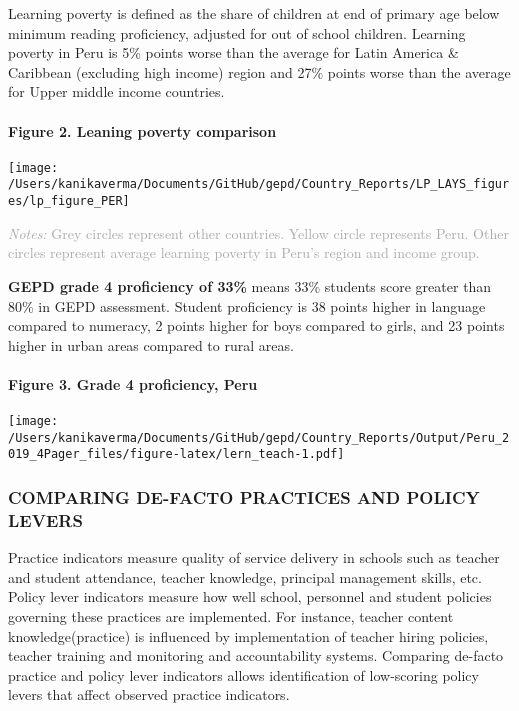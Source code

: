 \documentclass[twocolumn]{article}
\let\oldparagraph\paragraph
\renewcommand{\paragraph}[1]{\oldparagraph{#1}\mbox{}}
\begin{document}
Learning poverty is defined as the share of children at end of primary
age below minimum reading proficiency, adjusted for out of school
children. Learning poverty in Peru is 5\% points worse than the average
for Latin America \& Caribbean (excluding high income) region and 27\%
points worse than the average for Upper middle income countries.

\hypertarget{figure-2.-leaning-poverty-comparison}{%
\paragraph{Figure 2. Leaning poverty
comparison}\label{figure-2.-leaning-poverty-comparison}}

\texttt{[image: /Users/kanikaverma/Documents/GitHub/gepd/Country\_Reports/LP\_LAYS\_figures/lp\_figure\_PER]}

{\scriptsize
    \textcolor{darkgray}{\textit{Notes:} Grey circles represent other countries. Yellow circle represents Peru. Other circles represent average learning poverty in Peru's region and income group.}
  }

\textbf{GEPD grade 4 proficiency of 33\%} means 33\% students score
greater than 80\% in GEPD assessment. Student proficiency is 38 points
higher in language compared to numeracy, 2 points higher for boys
compared to girls, and 23 points higher in urban areas compared to rural
areas. \vfill\null

\hypertarget{figure-3.-grade-4-proficiency-peru}{%
\paragraph{Figure 3. Grade 4 proficiency,
Peru}\label{figure-3.-grade-4-proficiency-peru}}

\texttt{[image: /Users/kanikaverma/Documents/GitHub/gepd/Country\_Reports/Output/Peru\_2019\_4Pager\_files/figure-latex/lern\_teach-1.pdf]}

\hypertarget{comparing-de-facto-practices-and-policy-levers}{%
\subsubsection{\texorpdfstring{\textbf{COMPARING DE-FACTO PRACTICES AND
POLICY
LEVERS}}{COMPARING DE-FACTO PRACTICES AND POLICY LEVERS}}\label{comparing-de-facto-practices-and-policy-levers}}

Practice indicators measure quality of service delivery in schools such
as teacher and student attendance, teacher knowledge, principal
management skills, etc. Policy lever indicators measure how well school,
personnel and student policies governing these practices are
implemented. For instance, teacher content knowledge(practice) is
influenced by implementation of teacher hiring policies, teacher
training and monitoring and accountability systems. Comparing de-facto
practice and policy lever indicators allows identification of
low-scoring policy levers that affect observed practice indicators.
\end{document}
